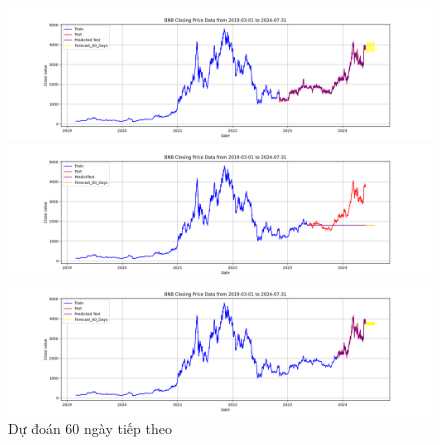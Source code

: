 \documentclass[conference]{IEEEtran}
\begin{document}
	\begin{figure}[H]
		\centering
		\begin{minipage}{0.15\textwidth}
			\centering
			\includegraphics[width=1\textwidth]{Figure/RandomForest_ETH_60days_73.png}
		\end{minipage}
		\hfill
		\begin{minipage}{0.15\textwidth}
			\centering
			\includegraphics[width=1\textwidth]{Figure/ARIMA_ETH_60days_82.png}
		\end{minipage}
		\hfill
		\begin{minipage}{0.15\textwidth}
			\centering
			\includegraphics[width=1\textwidth]{Figure/RandomForest_ETH_60days_91.png}
		\end{minipage}
		\caption{Dự đoán 60 ngày tiếp theo}
		\label{fig:1}
	\end{figure}
	
\end{document}
